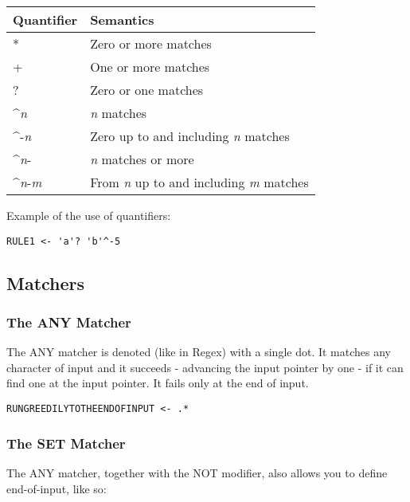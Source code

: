 \begin{center}
\caption{Naigama Quantifiers}
\label{tab:naig_quantifiers}
\begin{longtable}{ll}
\textbf{Quantifier} & \textbf{Semantics} \\
\endhead
* & Zero or more matches \\
+ & One or more matches \\
? & Zero or one matches \\
\^{}\textit{n} & \textit{n} matches \\
\^{}-\textit{n} & Zero up to and including \textit{n} matches \\
\^{}\textit{n}- & \textit{n} matches or more \\
\^{}\textit{n}-\textit{m} & From \textit{n} up to and including \textit{m} matches \\
\end{longtable}
\end{center}
 
Example of the use of quantifiers:
\begin{myquote}
\begin{verbatim}
RULE1 <- 'a'? 'b'^-5
\end{verbatim}
\end{myquote}

\subsection{Matchers}

\subsubsection{The ANY Matcher}

The ANY matcher is denoted (like in Regex) with a single dot.
It matches any character of input and it succeeds - advancing the input
pointer by one - if it can find one at the input pointer. It fails only
at the end of input.

\begin{myquote}
\begin{verbatim}
RUNGREEDILYTOTHEENDOFINPUT <- .*
\end{verbatim}
\end{myquote}

\subsubsection{The SET Matcher}

The ANY matcher, together with the NOT modifier,
also allows you to define end-of-input, like so:

